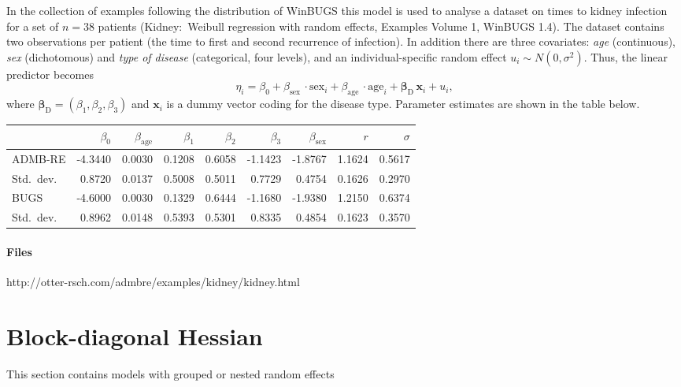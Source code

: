 \documentclass[12pt,letter,reqno]{book}
\begin{document}
In the collection of examples following the distribution of WinBUGS this model
is used to analyse a dataset on times to kidney infection for a set of $n=38$
patients (Kidney:\ Weibull regression with random effects, Examples Volume 1,
WinBUGS 1.4). The dataset contains two observations per patient (the time to
first and second recurrence of infection). In addition there are three
covariates: \emph{age} (continuous), \emph{sex} (dichotomous) and \emph{type of
  disease} (categorical, four levels), and an individual-specific random effect
$u_i\sim N(0,\sigma^2)$. Thus, the linear predictor becomes
\[
  \eta_i = \beta_0 + \beta_\mathrm{sex}\,\cdot\mathrm{sex}_i +
  \beta_\mathrm{age}\,\cdot\mathrm{age}_i +
  \mathbf{\beta}_\mathrm{D}\,\mathbf{x}_i + u_i,
\]
where $\mathbf{\beta}_\mathrm{D}=(\beta_1,\beta_2,\beta_3)$ and $\mathbf{x}_i$
is a dummy vector coding for the disease type. Parameter estimates are shown in
the table below. 
\begin{center}
  \footnotesize
  \begin{tabular}{lrrrrrrrr}
    \hline
              & $\beta_0$ & $\beta_\mathrm{age}$ & $\beta_1$ & $\beta_2$ & $ \beta_3$ & $\beta_\mathrm{sex}$ & $r$    & $\sigma$\\
    \hline
    ADMB-RE    & -4.3440   & 0.0030               & 0.1208    & 0.6058    & -1.1423    & -1.8767              & 1.1624 & 0.5617  \\
    Std.\ dev. &  0.8720   & 0.0137               & 0.5008    & 0.5011    &  0.7729    &  0.4754              & 0.1626 & 0.2970  \\
    BUGS       & -4.6000   & 0.0030               & 0.1329    & 0.6444    & -1.1680    & -1.9380              & 1.2150 & 0.6374  \\
    Std.\ dev. &  0.8962   & 0.0148               & 0.5393    & 0.5301    &  0.8335    &  0.4854              & 0.1623 & 0.3570  \\
    \hline
  \end{tabular}
\end{center}
\paragraph{Files} http://otter-rsch.com/admbre/examples/kidney/kidney.html

\section{Block-diagonal Hessian}
This section contains models with grouped or nested random effects
\end{document}
